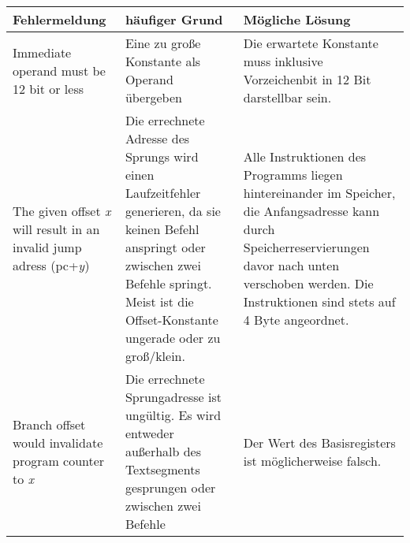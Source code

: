 \begin{tabular}{|p{5cm}|p{5cm}|p{5cm}|}
	\hline
	Fehlermeldung & häufiger Grund & Mögliche Lösung\\
	\hline
	Immediate operand must be 12 bit or less & Eine zu große Konstante als Operand übergeben & Die erwartete Konstante muss inklusive Vorzeichenbit in 12 Bit darstellbar sein.\\
	\hline
	The given offset \textit{x} will result in an invalid jump adress (pc+\textit{y}) &
	Die errechnete Adresse des Sprungs wird einen Laufzeitfehler generieren, da sie keinen Befehl anspringt oder zwischen zwei Befehle springt. Meist ist die Offset-Konstante ungerade oder zu groß/klein. & Alle Instruktionen des Programms liegen hintereinander im Speicher, die Anfangsadresse kann durch Speicherreservierungen davor nach unten verschoben werden. Die Instruktionen sind stets auf 4 Byte angeordnet.\\
	\hline
	Branch offset would invalidate program counter to \textit{x} & Die errechnete Sprungadresse ist ungültig. Es wird entweder außerhalb des Textsegments gesprungen oder zwischen zwei Befehle &
	Der Wert des Basisregisters ist möglicherweise falsch.\\
	\hline
\end{tabular}
